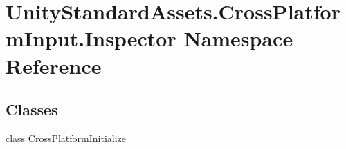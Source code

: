 \hypertarget{namespace_unity_standard_assets_1_1_cross_platform_input_1_1_inspector}{}\section{Unity\+Standard\+Assets.\+Cross\+Platform\+Input.\+Inspector Namespace Reference}
\label{namespace_unity_standard_assets_1_1_cross_platform_input_1_1_inspector}
\subsection*{Classes}
\begin{DoxyCompactItemize}
\item 
class \hyperlink{class_unity_standard_assets_1_1_cross_platform_input_1_1_inspector_1_1_cross_platform_initialize}{Cross\+Platform\+Initialize}
\end{DoxyCompactItemize}
